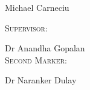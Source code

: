 \begin{titlepage}
\begin{minipage}{0.4\hsize}
Michael Carneciu\\
\end{minipage}
\hfill
\begin{minipage}{0.4\hsize}
\flushright
\textsc{Supervisor:}

Dr Anandha Gopalan\\
\vspace{0.5cm}
\textsc{Second Marker:}

Dr Naranker Dulay
\end{minipage}

\vspace{4cm}
\makeatletter
\begin{center}
\@date 
\end{center}

\vfill %



\makeatother


\end{titlepage}

